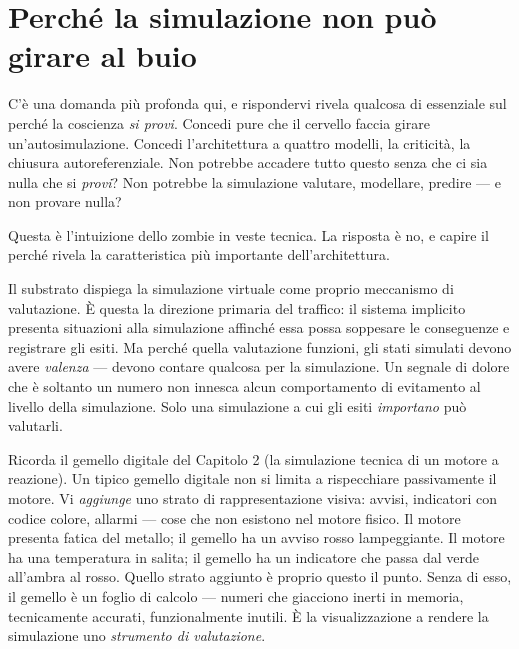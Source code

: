 \documentclass[11pt, twoside, openright]{book}
\begin{document}
\section*{Perché la simulazione non può girare al buio}

C'è una domanda più profonda qui, e rispondervi rivela qualcosa di essenziale sul perché la coscienza \textit{si provi}. Concedi pure che il cervello faccia girare un'autosimulazione. Concedi l'architettura a quattro modelli, la criticità, la chiusura autoreferenziale. Non potrebbe accadere tutto questo senza che ci sia nulla che si \textit{provi}? Non potrebbe la simulazione valutare, modellare, predire --- e non provare nulla?

Questa è l'intuizione dello zombie in veste tecnica. La risposta è no, e capire il perché rivela la caratteristica più importante dell'architettura.

Il substrato dispiega la simulazione virtuale come proprio meccanismo di valutazione. È questa la direzione primaria del traffico: il sistema implicito presenta situazioni alla simulazione affinché essa possa soppesare le conseguenze e registrare gli esiti. Ma perché quella valutazione funzioni, gli stati simulati devono avere \textit{valenza} --- devono contare qualcosa per la simulazione. Un segnale di dolore che è soltanto un numero non innesca alcun comportamento di evitamento al livello della simulazione. Solo una simulazione a cui gli esiti \textit{importano} può valutarli.

Ricorda il gemello digitale del Capitolo 2 (la simulazione tecnica di un motore a reazione). Un tipico gemello digitale non si limita a rispecchiare passivamente il motore. Vi \textit{aggiunge} uno strato di rappresentazione visiva: avvisi, indicatori con codice colore, allarmi --- cose che non esistono nel motore fisico. Il motore presenta fatica del metallo; il gemello ha un avviso rosso lampeggiante. Il motore ha una temperatura in salita; il gemello ha un indicatore che passa dal verde all'ambra al rosso. Quello strato aggiunto è proprio questo il punto. Senza di esso, il gemello è un foglio di calcolo --- numeri che giacciono inerti in memoria, tecnicamente accurati, funzionalmente inutili. È la visualizzazione a rendere la simulazione uno \textit{strumento di valutazione}.
\end{document}
